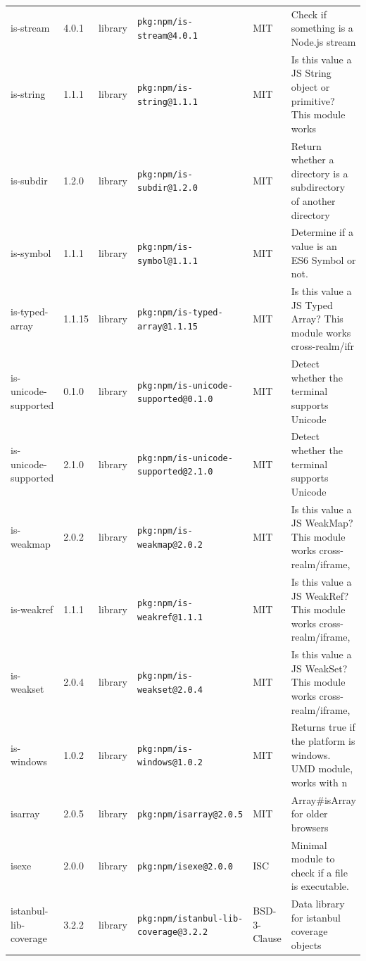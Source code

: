 \documentclass[11pt,a4paper]{article}
\begin{document}
\begin{longtable}{|p{4cm}|p{2cm}|p{1.6cm}|p{5cm}|p{1.5cm}|p{3.5cm}|}
\raggedright is-stream & 4.0.1 & library & \small\texttt{pkg:npm/is-stream@4.0.1} & MIT & \small Check if something is a Node.js stream \\
\raggedright is-string & 1.1.1 & library & \small\texttt{pkg:npm/is-string@1.1.1} & MIT & \small Is this value a JS String object or primitive? This module works  \\
\raggedright is-subdir & 1.2.0 & library & \small\texttt{pkg:npm/is-subdir@1.2.0} & MIT & \small Return whether a directory is a subdirectory of another directory \\
\raggedright is-symbol & 1.1.1 & library & \small\texttt{pkg:npm/is-symbol@1.1.1} & MIT & \small Determine if a value is an ES6 Symbol or not. \\
\raggedright is-typed-array & 1.1.15 & library & \small\texttt{pkg:npm/is-typed-array@1.1.15} & MIT & \small Is this value a JS Typed Array? This module works cross-realm/ifr \\
\raggedright is-unicode-supported & 0.1.0 & library & \small\texttt{pkg:npm/is-unicode-supported@0.1.0} & MIT & \small Detect whether the terminal supports Unicode \\
\raggedright is-unicode-supported & 2.1.0 & library & \small\texttt{pkg:npm/is-unicode-supported@2.1.0} & MIT & \small Detect whether the terminal supports Unicode \\
\raggedright is-weakmap & 2.0.2 & library & \small\texttt{pkg:npm/is-weakmap@2.0.2} & MIT & \small Is this value a JS WeakMap? This module works cross-realm/iframe, \\
\raggedright is-weakref & 1.1.1 & library & \small\texttt{pkg:npm/is-weakref@1.1.1} & MIT & \small Is this value a JS WeakRef? This module works cross-realm/iframe, \\
\raggedright is-weakset & 2.0.4 & library & \small\texttt{pkg:npm/is-weakset@2.0.4} & MIT & \small Is this value a JS WeakSet? This module works cross-realm/iframe, \\
\raggedright is-windows & 1.0.2 & library & \small\texttt{pkg:npm/is-windows@1.0.2} & MIT & \small Returns true if the platform is windows. UMD module, works with n \\
\raggedright isarray & 2.0.5 & library & \small\texttt{pkg:npm/isarray@2.0.5} & MIT & \small Array\#isArray for older browsers \\
\raggedright isexe & 2.0.0 & library & \small\texttt{pkg:npm/isexe@2.0.0} & ISC & \small Minimal module to check if a file is executable. \\
\raggedright istanbul-lib-coverage & 3.2.2 & library & \small\texttt{pkg:npm/istanbul-lib-coverage@3.2.2} & BSD-3-Clause & \small Data library for istanbul coverage objects \\

\end{longtable}
\end{document}
